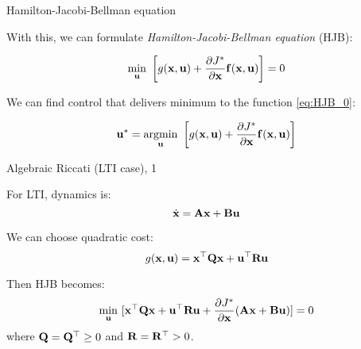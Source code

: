 \documentclass{beamer}
\begin{document}
\begin{frame}{Hamilton-Jacobi-Bellman equation}
\begin{flushleft}

With this, we can formulate \emph{Hamilton-Jacobi-Bellman equation} (HJB):

\begin{equation}
\label{eq:HJB_0}
\underset{\bo{u}}{\min} \ 
\left[ 
g(\bo{x}, \bo{u}) + 
\frac{\partial J^*}{\partial \bo{x}} \bo{f} (\bo{x}, \bo{u}) 
\right] = 0
\end{equation}


\bigskip


We can find control that delivers minimum to the function \eqref{eq:HJB_0}:

\begin{equation}
\bo{u}^* = \underset{\bo{u}}{\text{argmin}} \ 
\left[ 
g(\bo{x}, \bo{u}) + 
\frac{\partial J^*}{\partial \bo{x}} \bo{f} (\bo{x}, \bo{u}) \right] 
\end{equation}

\end{flushleft}
\end{frame}





\begin{frame}{Algebraic Riccati (LTI case), 1}
\begin{flushleft}

For LTI, dynamics is:
\begin{equation}
\dot {\mathbf{x}} = \mathbf{A}  \mathbf{x} + \mathbf{B} \mathbf{u}
\end{equation}

We can choose quadratic cost:
\begin{equation}
g(\mathbf  x, \mathbf  u) = 
\mathbf  x^\top \mathbf{Q} \mathbf{x} +
\mathbf  u^\top \mathbf{R} \mathbf{u} 
\end{equation}

Then HJB becomes:
\begin{equation}
\underset{\mathbf{u}}{\min} \ [ 
\mathbf{x}^\top \mathbf{Q} \mathbf{x} +
\mathbf{u}^\top \mathbf{R} \mathbf{u} + 
\frac{\partial J^*}{\partial \mathbf{x}} 
(\mathbf{A} \mathbf{x} + \mathbf{B} \mathbf{u})] = 0
\end{equation}
%
where $\mathbf{Q} = \mathbf{Q}^\top \geq 0 $ and $\mathbf{R} = \mathbf{R}^\top > 0$.

\end{flushleft}
\end{frame}
\end{document}
